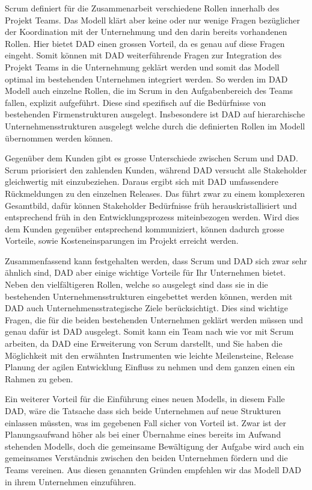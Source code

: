 Scrum definiert für die Zusammenarbeit verschiedene Rollen innerhalb des Projekt Teams. Das Modell klärt aber keine oder nur wenige Fragen bezüglicher der Koordination mit der Unternehmung und den darin bereits vorhandenen Rollen. Hier bietet DAD einen grossen Vorteil, da es genau auf diese Fragen eingeht. Somit können mit DAD weiterführende Fragen zur Integration des Projekt Teams in die Unternehmung geklärt werden und somit das Modell optimal im bestehenden Unternehmen integriert werden. So werden im DAD Modell auch einzelne Rollen, die im Scrum in den Aufgabenbereich des Teams fallen, explizit aufgeführt. Diese sind spezifisch auf die Bedürfnisse von bestehenden Firmenstrukturen ausgelegt. Insbesondere ist DAD auf hierarchische Unternehmensstrukturen ausgelegt welche durch die definierten Rollen im Modell übernommen werden können.\newline

Gegenüber dem Kunden gibt es grosse Unterschiede zwischen Scrum und DAD. Scrum priorisiert den zahlenden Kunden, während DAD versucht alle Stakeholder gleichwertig mit einzubeziehen. Daraus ergibt sich mit DAD umfassendere Rückmeldungen zu den einzelnen Releases. Das führt zwar zu einem komplexeren Gesamtbild, dafür können Stakeholder Bedürfnisse früh herauskristallisiert und entsprechend früh in den Entwicklungsprozess miteinbezogen werden. Wird dies dem Kunden gegenüber entsprechend kommuniziert, können dadurch grosse Vorteile, sowie Kosteneinsparungen im Projekt erreicht werden. 

Zusammenfassend kann festgehalten werden, dass Scrum und DAD sich zwar sehr ähnlich sind, DAD aber einige wichtige Vorteile für Ihr Unternehmen bietet. Neben den vielfältigeren Rollen, welche so ausgelegt sind dass sie in die bestehenden Unternehmensstrukturen eingebettet werden können, werden mit DAD auch Unternehmensstrategische Ziele berücksichtigt. Dies sind wichtige Fragen, die für die beiden bestehenden Unternehmen geklärt werden müssen und genau dafür ist DAD ausgelegt. Somit kann ein Team nach wie vor mit Scrum arbeiten, da DAD eine Erweiterung von Scrum darstellt,  und Sie haben die Möglichkeit mit den erwähnten Instrumenten wie leichte Meilensteine, Release Planung der agilen Entwicklung Einfluss zu nehmen und dem ganzen einen ein Rahmen zu geben.\newline

Ein weiterer Vorteil für die Einführung eines neuen Modells, in diesem Falle DAD, wäre die Tatsache dass sich beide Unternehmen auf neue Strukturen einlassen müssten, was im gegebenen Fall sicher von Vorteil ist. Zwar ist der Planungsaufwand höher als bei einer Übernahme eines bereits im Aufwand stehenden Modells, doch die gemeinsame Bewältigung der Aufgabe wird auch ein gemeinsames Verständnis zwischen den beiden Unternehmen fördern und die Teams vereinen. Aus diesen genannten Gründen empfehlen wir das Modell DAD in ihrem Unternehmen einzuführen.





	